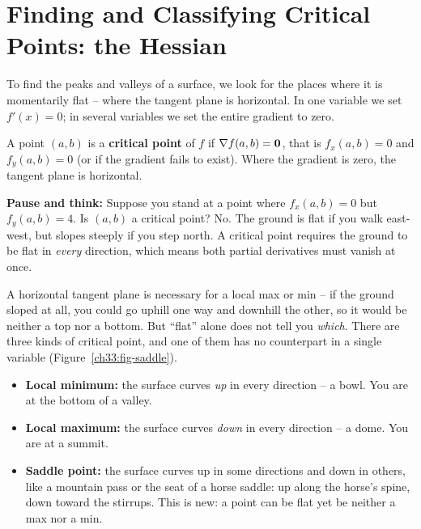 \section{Finding and Classifying Critical Points: the Hessian}
\label{ch33:hessian}

To find the peaks and valleys of a surface, we look for the places where it is
momentarily flat -- where the tangent plane is horizontal. In one variable we set
$f'(x)=0$; in several variables we set the entire gradient to zero.

\begin{definition}
\label{ch33:def-critical}
A point $(a,b)$ is a \textbf{critical point} of $f$ if $\nabla f(a,b)=\mathbf{0}$, that
is $f_x(a,b)=0$ and $f_y(a,b)=0$ (or if the gradient fails to exist). Where the
gradient is zero, the tangent plane is horizontal.
\end{definition}

\textbf{Pause and think:} Suppose you stand at a point where $f_x(a,b)=0$ but $f_y(a,b)=4$. Is $(a,b)$ a critical point? No. The ground is flat if you walk east-west, but slopes steeply if you step north. A critical point requires the ground to be flat in \emph{every} direction, which means both partial derivatives must vanish at once.

A horizontal tangent plane is necessary for a local max or min -- if the ground
sloped at all, you could go uphill one way and downhill the other, so it would be
neither a top nor a bottom. But ``flat'' alone does not tell you \emph{which}.
There are three kinds of critical point, and one of them has no counterpart in a
single variable (Figure~\ref{ch33:fig-saddle}).

\begin{itemize}
\item \textbf{Local minimum:} the surface curves \emph{up} in every direction -- a
bowl. You are at the bottom of a valley.
\item \textbf{Local maximum:} the surface curves \emph{down} in every direction --
a dome. You are at a summit.
\item \textbf{Saddle point:} the surface curves up in some directions and down in
others, like a mountain pass or the seat of a horse saddle: up along the horse's
spine, down toward the stirrups. This is new: a point can be flat yet be neither a
max nor a min.
\end{itemize}

